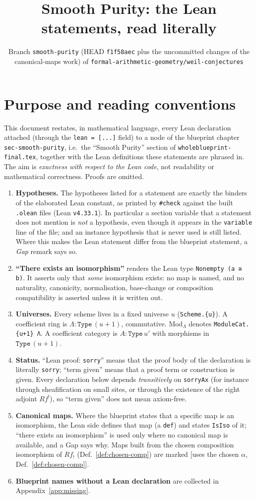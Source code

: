 \documentclass[10pt]{article}
\title{Smooth Purity: the Lean statements, read literally}
\author{}
\date{Branch \texttt{smooth-purity} (HEAD \texttt{f1f58aec} plus the uncommitted changes of the canonical-maps work) of
\texttt{formal-arithmetic-geometry/weil-conjectures}}
\theoremstyle{definition}
\theoremstyle{remark}
\newcommand{\lean}[1]{{\small\nolinkurl{#1}}}
\newcommand{\leanu}[1]{{\small\texttt{#1}}}
\newcommand{\SORRY}{\textcolor{red!70!black}{\texttt{sorry}}}
\newcommand{\PROVED}{\textcolor{green!40!black}{term given}}
\newcommand{\CHOSEN}{\textcolor{orange!70!black}{\textsf{[uses the chosen $\alpha$, Def.~\ref{def:chosen-comp}]}}}
\newcommand{\Mod}{\mathrm{Mod}}
\begin{document}
\maketitle

\section*{Purpose and reading conventions}

This document restates, in mathematical language, every Lean declaration attached
(through the \texttt{lean = [...]} field) to a node of the blueprint chapter
\texttt{sec-smooth-purity}, i.e.\ the ``Smooth Purity'' section of
\texttt{wholeblueprint-final.tex}, together with the Lean definitions these statements
are phrased in. The aim is \emph{exactness with respect to the Lean code}, not
readability or mathematical correctness. Proofs are omitted.

\begin{enumerate}
\item \textbf{Hypotheses.} The hypotheses listed for a statement are exactly the binders
of the elaborated Lean constant, as printed by \texttt{\#check} against the built
\texttt{.olean} files (Lean \texttt{v4.33.1}). In particular a section variable that a
statement does not mention is \emph{not} a hypothesis, even though it appears in the
\texttt{variable} line of the file; and an instance hypothesis that is never used is still
listed. Where this makes the Lean statement differ from the blueprint statement, a
\emph{Gap} remark says so.
\item \textbf{``There exists an isomorphism''} renders the Lean type
\leanu{Nonempty (a ≅ b)}. It asserts only that \emph{some} isomorphism exists: no map is
named, and no naturality, canonicity, normalisation, base-change or composition
compatibility is asserted unless it is written out.
\item \textbf{Universes.} Every scheme lives in a fixed universe $u$
(\lean{Scheme.{u}}). A coefficient ring is $\Lambda:\mathtt{Type}\,(u+1)$, commutative.
$\Mod_\Lambda$ denotes \lean{ModuleCat.{u+1} Λ}. A coefficient category is
$A:\mathtt{Type}\,u'$ with morphisms in $\mathtt{Type}\,(u+1)$.
\item \textbf{Status.} ``Lean proof: \SORRY'' means that the proof body of the declaration is
literally \texttt{sorry}; ``\PROVED'' means that a proof term or construction is given.
Every declaration below depends \emph{transitively} on \texttt{sorryAx} (for instance
through sheafification on small sites, or through the existence of the right adjoint
$Rf^!$), so ``\PROVED'' does not mean axiom-free.
\item \textbf{Canonical maps.} Where the blueprint states that a specific map is an isomorphism, the
Lean side defines that map (a \lean{def}) and states \lean{IsIso} of it; ``there exists an isomorphism'' is used only where
no canonical map is available, and a Gap says why. Maps built from the chosen composition isomorphism of $Rf_!$
(Def.~\ref{def:chosen-comp}) are marked \CHOSEN.
\item \textbf{Blueprint names without a Lean declaration} are collected in
Appendix~\ref{app:missing}.
\end{enumerate}
\end{document}
